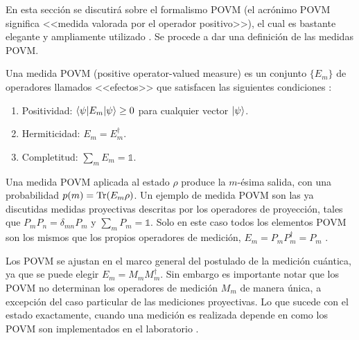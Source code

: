 En esta sección se discutirá sobre el formalismo POVM (el acrónimo POVM significa <<medida valorada por el operador positivo>>), el cual es bastante elegante y ampliamente utilizado {\cite{nielsen_chuang_2010}}. Se procede a dar una definición de las medidas POVM\@. 

\begin{definition} Una medida POVM (positive operator-valued measure) es un conjunto $\{E_{m}\}$ de operadores llamados <<efectos>> que satisfacen las siguientes condiciones {\cite{2007geometry}}:
	\begin{enumerate}
		\item Positividad: $\langle \psi |E_m|\psi \rangle \ge 0 $ para cualquier vector $|\psi\rangle$.
		\item Hermiticidad: $E_m=E_{m}^\dagger$.
		\item  Completitud: $\sum_m E_m =\mathds{1}$.
	\end{enumerate}
\end{definition}

Una medida POVM aplicada al estado $\rho$ produce la $m$-ésima salida, con una
probabilidad $p(m)={\rm Tr}(E_m \rho)$. Un ejemplo de medida POVM son las ya
discutidas medidas proyectivas descritas por los operadores de proyección,
tales que $P_m P_n=\delta_{mn}P_{m}$ y $\sum_m P_m = \mathds{1}$. Solo en este
caso todos los elementos POVM son los mismos que los propios operadores de
medición, $E_m=P_m P_m^\dagger=P_m$ {\cite{nielsen_chuang_2010}}.

Los POVM se ajustan en el marco general del postulado de la medición cuántica, ya que se puede elegir $E_m=M_m M_m^{\dagger}$. Sin embargo es importante notar que los POVM no determinan los operadores de
medición $M_m$ de manera única, a excepción del caso particular de las
mediciones proyectivas. Lo que sucede con el estado exactamente, cuando una
medición es realizada depende en como los POVM son implementados en el
laboratorio {\cite{2007geometry}}.   



